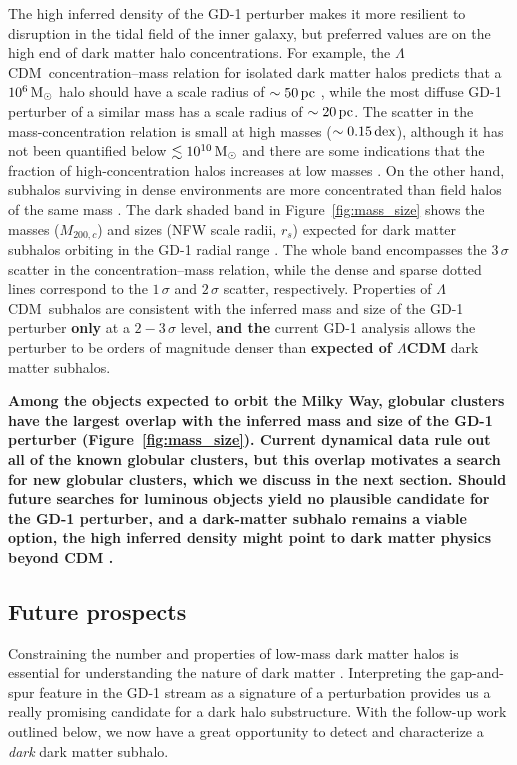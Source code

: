 \documentclass[twocolumn]{aastex62}
\newcommand{\acronym}[1]{{\small{#1}}}
\newcommand{\lcdm}{\acronym{$\Lambda$CDM}}
\newcommand{\changes}[1]{{\textbf{#1}}}
\begin{document}
The high inferred density of the GD-1 perturber makes it more resilient to disruption in the tidal field of the inner galaxy, but preferred values are on the high end of dark matter halo concentrations.
For example, the \lcdm\ concentration--mass relation for isolated dark matter halos predicts that a $10^6\,\rm M_\odot$ halo should have a scale radius of $\sim50\,\rm pc$ \citep{diemer2018}, while the most diffuse GD-1 perturber of a similar mass has a scale radius of $\sim20\,\rm pc$.
The scatter in the mass-concentration relation is small at high masses ($\sim0.15\,\rm dex$), although it has not been quantified below $\lesssim10^{10}\,\rm M_\odot$ and there are some indications that the fraction of high-concentration halos increases at low masses \citep{diemer2015}.
On the other hand, subhalos surviving in dense environments are more concentrated than field halos of the same mass \citep[e.g.,][]{avilareese2005}.
The dark shaded band in Figure~\ref{fig:mass_size} shows the masses ($M_{200,c}$) and sizes (NFW scale radii, $r_s$) expected for dark matter subhalos orbiting in the GD-1 radial range \citep{moline2017}.
The whole band encompasses the $3\,\sigma$ scatter in the concentration--mass relation, while the dense and sparse dotted lines correspond to the $1\,\sigma$ and $2\,\sigma$ scatter, respectively.
Properties of \lcdm\ subhalos are consistent with the inferred mass and size of the GD-1 perturber \changes{only} at a $2-3\,\sigma$ level, \changes{and the} current GD-1 analysis allows the perturber to be orders of magnitude denser than \changes{expected of $\Lambda$CDM} dark matter subhalos.

\changes{Among the objects expected to orbit the Milky Way, globular clusters have the largest overlap with the inferred mass and size of the GD-1 perturber (Figure~\ref{fig:mass_size}).
Current dynamical data rule out all of the known globular clusters, but this overlap motivates a search for new globular clusters, which we discuss in the next section.
Should future searches for luminous objects yield no plausible candidate for the GD-1 perturber, and a dark-matter subhalo remains a viable option, the high inferred density might point to dark matter physics beyond CDM \citep[e.g.,][]{kahlhofer2019}.
}


\subsection{Future prospects}
\label{sec:future}
Constraining the number and properties of low-mass dark matter halos is essential for understanding the nature of dark matter \citep{bullockmbk2017}.
Interpreting the gap-and-spur feature in the GD-1 stream as a signature of a perturbation provides us a really promising candidate for a dark halo substructure.
With the follow-up work outlined below, we now have a great opportunity to detect and characterize a \emph{dark} dark matter subhalo.
\end{document}
